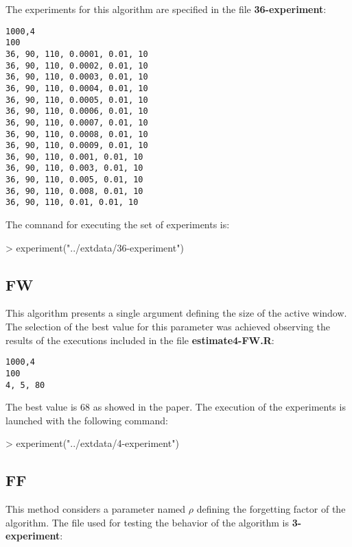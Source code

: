\documentclass{article}
\begin{document}
The experiments for this algorithm are specified in the file \textbf{36-experiment}:

\begin{verbatim}
1000,4
100
36, 90, 110, 0.0001, 0.01, 10
36, 90, 110, 0.0002, 0.01, 10
36, 90, 110, 0.0003, 0.01, 10
36, 90, 110, 0.0004, 0.01, 10
36, 90, 110, 0.0005, 0.01, 10
36, 90, 110, 0.0006, 0.01, 10
36, 90, 110, 0.0007, 0.01, 10
36, 90, 110, 0.0008, 0.01, 10
36, 90, 110, 0.0009, 0.01, 10
36, 90, 110, 0.001, 0.01, 10
36, 90, 110, 0.003, 0.01, 10
36, 90, 110, 0.005, 0.01, 10
36, 90, 110, 0.008, 0.01, 10
36, 90, 110, 0.01, 0.01, 10
\end{verbatim}

The comnand for executing the set of experiments is:

\begin{Schunk}
\begin{Sinput}
> experiment("../extdata/36-experiment")
\end{Sinput}
\end{Schunk}

\subsection{FW}

This algorithm presents a single argument defining the size of the active
window. The selection of the best value for this parameter was achieved
observing the results of the executions included in the file \textbf{estimate4-FW.R}:

\begin{verbatim}
1000,4
100
4, 5, 80
\end{verbatim}

The best value is $68$ as showed in the paper. The execution of the experiments
is launched with the following command:

\begin{Schunk}
\begin{Sinput}
> experiment("../extdata/4-experiment")
\end{Sinput}
\end{Schunk}

\subsection{FF}

This method considers a parameter named $\rho$ defining the forgetting factor
of the algorithm. The file used for testing the behavior of the algorithm is
\textbf{3-experiment}:
\end{document}
